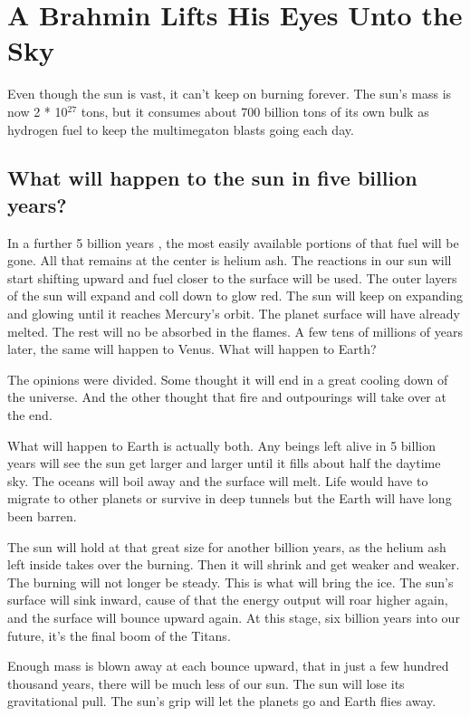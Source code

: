 %

\section{A Brahmin Lifts His Eyes Unto the Sky}

Even though the sun is vast, it can't keep on burning forever. The sun's mass is now 2 * 10$^{27}$ tons, but it consumes about 700 billion tons of its own bulk as hydrogen fuel to keep the multimegaton blasts going each day.

\subsection*{What will happen to the sun in five billion years?}
In a further 5 billion years , the most easily available portions of that fuel will be gone. All that remains at the center is helium ash. The reactions in our sun will start shifting upward and fuel closer to the surface will be used. The outer layers of the sun will expand and coll down to glow red. The sun will keep on expanding and glowing until it reaches Mercury's orbit. The planet surface will have already melted. The rest will no be absorbed in the flames. A few tens of millions of years later, the same will happen to Venus. What will happen to Earth?

The opinions were divided. Some thought it will end in a great cooling down of the universe. And the other thought that fire and outpourings will take over at the end.

What will happen to Earth is actually both. Any beings left alive in 5 billion years will see the sun get larger and larger until it fills about half the daytime sky. The oceans will boil away and the surface will melt. Life would have to migrate to other planets or survive in deep tunnels but the Earth will have long been barren.

The sun will hold at that great size for another billion years, as the helium ash left inside takes over the burning. Then it will shrink and get weaker and weaker. The burning will not longer be steady. This is what will bring the ice. The sun's surface will sink inward, cause of that the energy output will roar higher again, and the surface will bounce upward again. At this stage, six billion years into our future, it's the final boom of the Titans.

Enough mass is blown away at each bounce upward, that in just a few hundred thousand years, there will be much less of our sun. The sun will lose its gravitational pull. The sun's grip will let the planets go and Earth flies away.


